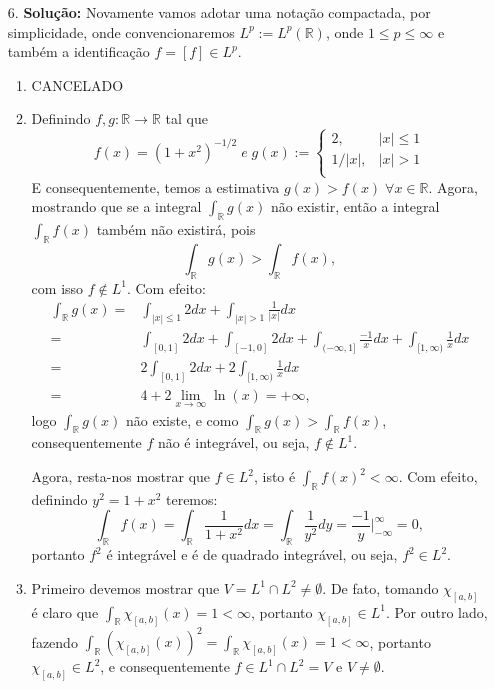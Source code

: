 \documentclass{article}
\begin{document}
\begin{enumerate}
		\item[6.] \textbf{Solução:} Novamente vamos adotar uma notação compactada, por simplicidade, onde convencionaremos $L^{p} := L^{p}(\mathbb{R})$, onde $1 \leq p \leq \infty$ e também a identificação $f = [f] \in L^{p}$.
			\begin{enumerate}
				\item CANCELADO
				\item Definindo $f, g:\mathbb{R} \to \mathbb{R} $ tal que 
				$$
				f(x) = (1+x^{2})^{-1/2} \; e \;
				g(x) := \left\{
				\begin{array}{cc}
				2, & |x| \leq 1 \\
				1/|x|, & |x| > 1 \\
				\end{array}
				\right.
				$$
				E consequentemente, temos a estimativa $g(x) > f(x) \; \forall x \in \mathbb{R}$. Agora, mostrando que se a integral $\int_{\mathbb{R}}g(x)$ não existir, então a integral $\int_{\mathbb{R}}f(x)$ também não existirá, pois
				$$
				\int_{\mathbb{R}}g(x) > \int_{\mathbb{R}}f(x),
				$$
				com isso $f \notin L^{1}$. Com efeito:
				$$
				\begin{aligned}
				\int_{\mathbb{R}}g(x) 
				= & \int_{|x| \leq 1} 2 dx + \int_{|x| > 1} \frac{1}{|x|} dx \\
				= & \int_{[0,1]} 2 dx + \int_{[-1,0]} 2 dx + \int_{(-\infty, 1]}\frac{-1}{x}dx + \int_{[1, \infty)}\frac{1}{x}dx \\
				= & 2\int_{[0,1]} 2 dx +  2\int_{[1, \infty)}\frac{1}{x}dx \\
				= & 4 + 2 \lim_{x \to \infty} \ln(x) = +\infty,  
				\end{aligned}
				$$
				logo 
				$\int_{\mathbb{R}}g(x)$ não existe, e como $\int_{\mathbb{R}}g(x)> \int_{\mathbb{R}}f(x)$, consequentemente $f$ não é integrável, ou seja, $f \notin L^{1}$.
				
				Agora, resta-nos mostrar que $f \in L^{2}$, isto é $\int_{\mathbb{R}}f(x)^{2} <\infty$. Com efeito, definindo $y^{2} = 1+x^{2}$ teremos:
				$$
				\int_{\mathbb{R}}f(x) 
				= \int_{\mathbb{R}}\frac{1}{1+x^{2}}dx = \int_{\mathbb{R}}\frac{1}{y^{2}}dy = \frac{ -1}{y} \Big|^{\infty}_{-\infty} = 0,
				$$
				portanto $f^{2}$ é integrável e é de quadrado integrável, ou seja, $f^{2} \in L^{2}$.
				
				\item Primeiro devemos mostrar que $V= L^{1} \cap L^{2} \neq \emptyset$. De fato, tomando $\chi_{[a, b]}$ é claro que $\int_{\mathbb{R}} \chi_{[a,b]}(x) = 1 < \infty$, portanto $\chi_{[a, b]} \in L^{1}$. Por outro lado, fazendo $\int_{\mathbb{R}} (\chi_{[a,b]}(x))^{2} = \int_{\mathbb{R}} \chi_{[a,b]}(x) = 1 < \infty$, portanto $\chi_{[a, b]} \in L^{2}$, e consequentemente $f \in L^{1} \cap L^{2} = V$ e $V \neq \emptyset$.
				

\end{enumerate}
\end{enumerate}
\end{document}
